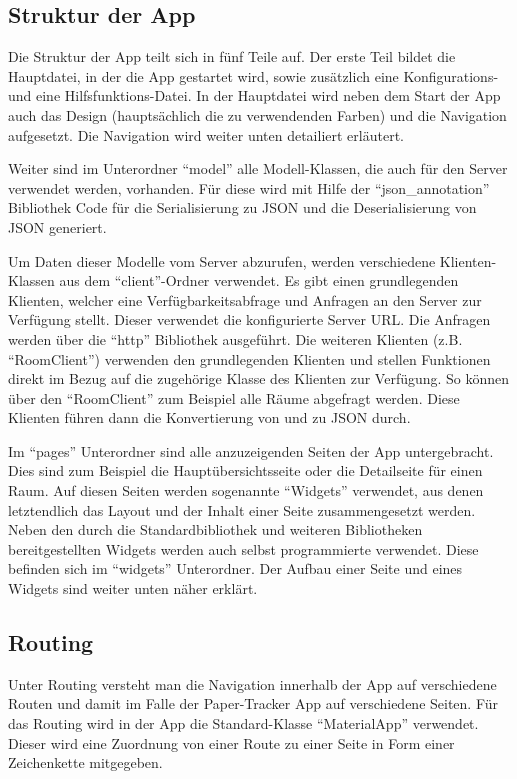 \subsection{Struktur der App}

Die Struktur der App teilt sich in fünf Teile auf.
Der erste Teil bildet die Hauptdatei, in der die App gestartet wird, sowie zusätzlich eine Konfigurations- und eine
Hilfsfunktions-Datei.
In der Hauptdatei wird neben dem Start der App auch das Design (hauptsächlich die zu verwendenden Farben) und die
Navigation aufgesetzt.
Die Navigation wird weiter unten detailiert erläutert.

Weiter sind im Unterordner \enquote{model} alle Modell-Klassen, die auch für den Server verwendet werden, vorhanden.
Für diese wird mit Hilfe der \enquote{json\_annotation} Bibliothek Code für die Serialisierung zu \gls{JSON} und die
Deserialisierung von \gls{JSON} generiert.

Um Daten dieser Modelle vom Server abzurufen, werden verschiedene Klienten-Klassen aus dem \enquote{client}-Ordner verwendet.
Es gibt einen grundlegenden Klienten, welcher eine Verfügbarkeitsabfrage und Anfragen an den Server zur Verfügung stellt.
Dieser verwendet die konfigurierte Server \gls{URL}.
Die Anfragen werden über die \enquote{http} Bibliothek ausgeführt.
Die weiteren Klienten (z.B. \enquote{RoomClient}) verwenden den grundlegenden Klienten und stellen Funktionen direkt im Bezug
auf die zugehörige Klasse des Klienten zur Verfügung.
So können über den \enquote{RoomClient} zum Beispiel alle Räume abgefragt werden.
Diese Klienten führen dann die Konvertierung von und zu \gls{JSON} durch.

Im \enquote{pages} Unterordner sind alle anzuzeigenden Seiten der App untergebracht.
Dies sind zum Beispiel die Hauptübersichtsseite oder die Detailseite für einen Raum.
Auf diesen Seiten werden sogenannte \enquote{Widgets} verwendet, aus denen letztendlich das Layout und der Inhalt einer
Seite zusammengesetzt werden.
Neben den durch die Standardbibliothek und weiteren Bibliotheken bereitgestellten Widgets werden auch selbst programmierte verwendet.
Diese befinden sich im \enquote{widgets} Unterordner.
Der Aufbau einer Seite und eines Widgets sind weiter unten näher erklärt.

\subsection{Routing}

Unter Routing versteht man die Navigation innerhalb der App auf verschiedene Routen und damit im Falle der Paper-Tracker
App auf verschiedene Seiten.
Für das Routing wird in der App die Standard-Klasse \enquote{MaterialApp} verwendet.
Dieser wird eine Zuordnung von einer Route zu einer Seite in Form einer Zeichenkette mitgegeben.

